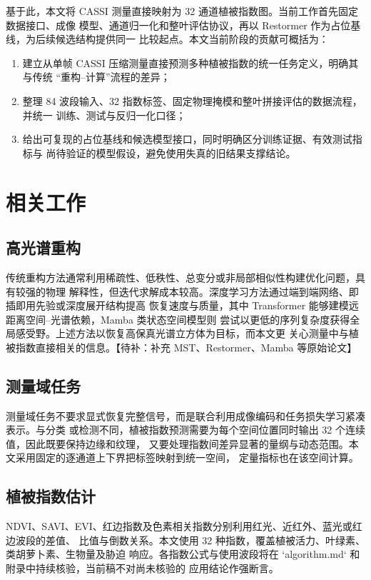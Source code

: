 \documentclass[UTF8,12pt,a4paper]{ctexart}
\newcommand{\todo}[1]{\textcolor{red!70!black}{【待补：#1】}}
\begin{document}
基于此，本文将 CASSI 测量直接映射为 32 通道植被指数图。当前工作首先固定数据接口、成像
模型、通道归一化和整叶评估协议，再以 Restormer 作为占位基线，为后续候选结构提供同一
比较起点。本文当前阶段的贡献可概括为：
\begin{enumerate}[leftmargin=2.5em]
  \item 建立从单帧 CASSI 压缩测量直接预测多种植被指数的统一任务定义，明确其与传统
  “重构--计算”流程的差异；
  \item 整理 84 波段输入、32 指数标签、固定物理掩模和整叶拼接评估的数据流程，并统一
  训练、测试与反归一化口径；
  \item 给出可复现的占位基线和候选模型接口，同时明确区分训练证据、有效测试指标与
  尚待验证的模型假设，避免使用失真的旧结果支撑结论。
\end{enumerate}

\section{相关工作}

\subsection{高光谱重构}
传统重构方法通常利用稀疏性、低秩性、总变分或非局部相似性构建优化问题，具有较强的物理
解释性，但迭代求解成本较高。深度学习方法通过端到端网络、即插即用先验或深度展开结构提高
恢复速度与质量，其中 Transformer 能够建模远距离空间--光谱依赖，Mamba 类状态空间模型则
尝试以更低的序列复杂度获得全局感受野。上述方法以恢复高保真光谱立方体为目标，而本文更
关心测量中与植被指数直接相关的信息。\todo{补充 MST、Restormer、Mamba 等原始论文}

\subsection{测量域任务}
测量域任务不要求显式恢复完整信号，而是联合利用成像编码和任务损失学习紧凑表示。与分类
或检测不同，植被指数预测需要为每个空间位置同时输出 32 个连续值，因此既要保持边缘和纹理，
又要处理指数间差异显著的量纲与动态范围。本文采用固定的逐通道上下界把标签映射到统一空间，
定量指标也在该空间计算。

\subsection{植被指数估计}
NDVI、SAVI、EVI、红边指数及色素相关指数分别利用红光、近红外、蓝光或红边波段的差值、
比值与倒数关系。本文使用 32 种指数，覆盖植被活力、叶绿素、类胡萝卜素、生物量及胁迫
响应。各指数公式与使用波段将在 `algorithm.md` 和附录中持续核验，当前稿不对尚未核验的
应用结论作强断言。
\end{document}
